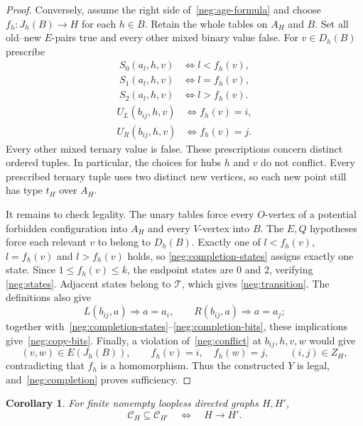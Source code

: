 \documentclass{article}
\numberwithin{equation}{section}
\newtheorem{corollary}[theorem]{Corollary}
\theoremstyle{definition}
\begin{document}
\begin{proof}
Conversely, assume the right side of~\eqref{neg:age-formula} and choose
$f_h:J_h(B)\to H$ for each $h\in B$. Retain the whole tables on $A_H$
and $B$. Set all old--new $E$-pairs true and every other mixed binary value
false. For $v\in D_h(B)$ prescribe
\begin{equation}\label{neg:completion-states}
 \begin{aligned}
 S_0(a_l,h,v)&\Longleftrightarrow l<f_h(v),\\
 S_1(a_l,h,v)&\Longleftrightarrow l=f_h(v),\\
 S_2(a_l,h,v)&\Longleftrightarrow l>f_h(v).
 \end{aligned}
\end{equation}
\begin{equation}\label{neg:completion-bits}
 \begin{aligned}
 U_L(b_{ij},h,v)&\Longleftrightarrow f_h(v)=i,\\
 U_R(b_{ij},h,v)&\Longleftrightarrow f_h(v)=j.
 \end{aligned}
\end{equation}
Every other mixed ternary value is false. These prescriptions concern
distinct ordered tuples. In particular, the choices for hubs $h$ and $v$
do not conflict. Every prescribed ternary tuple uses two distinct new
vertices, so each new point still has type $t_H$ over $A_H$.

It remains to check legality. The unary tables force every $O$-vertex of a
potential forbidden configuration into $A_H$ and every $V$-vertex into $B$.
The $E,Q$ hypotheses force each relevant $v$ to belong to $D_h(B)$.
Exactly one of $l<f_h(v)$, $l=f_h(v)$ and $l>f_h(v)$ holds, so
\eqref{neg:completion-states} assigns exactly one state. Since
$1\leq f_h(v)\leq k$, the endpoint states are $0$ and $2$, verifying
\eqref{neg:states}. Adjacent states belong to $\mathcal T$, which gives
\eqref{neg:transition}. The definitions also give
\[
 L(b_{ij},a)\Rightarrow a=a_i,\qquad
 R(b_{ij},a)\Rightarrow a=a_j;
\]
together with~\eqref{neg:completion-states}--\eqref{neg:completion-bits},
these implications give~\eqref{neg:copy-bits}.
Finally, a violation of~\eqref{neg:conflict} at $b_{ij},h,v,w$ would give
\[
 (v,w)\in E(J_h(B)),\qquad f_h(v)=i,\quad f_h(w)=j,
 \qquad(i,j)\in Z_H,
\]
contradicting that $f_h$ is a homomorphism. Thus the constructed $Y$ is
legal, and~\eqref{neg:completion} proves sufficiency.
\end{proof}

\begin{corollary}\label{neg:hom-order}
For finite nonempty loopless directed graphs $H,H'$,
\begin{equation}\label{neg:hom-order-equation}
 \mathcal C_H\subseteq\mathcal C_{H'}\quad\Longleftrightarrow\quad H\to H'.
\end{equation}
\end{corollary}
\end{document}
